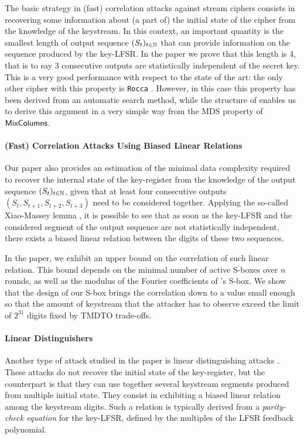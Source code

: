 The basic strategy in (fast) correlation attacks against stream ciphers consists in recovering some information about (a part of) the initial state of the cipher from the knowledge of the keystream. 
In this context, an important quantity is the smallest length of output sequence $(S_t)_{t\in \mathbb{N}}$ that can provide information on the sequence produced by the key-LFSR. In the paper we prove that this length is 4, that is to say 3 consecutive outputs are statistically independent of the secret key. This is a very good performance with respect to the state of the art: the only other cipher with this property is \texttt{Rocca} \cite[Section 4.5]{ToSC:SLNKI21}. However, in this case this property has been derived from an automatic search method, while the structure of \coolName enables us to derive this argument in a very simple way from the MDS property of~$\text{\textsf{MixColumns}}$. 


\paragraph{(Fast) Correlation Attacks Using Biased Linear Relations}


Our paper also provides an estimation of the minimal data complexity required to recover the internal state of the key-register from the knowledge of the output sequence $(S_t)_{t\in \mathbb{N}}$, given that at least four consecutive outputs $(S_t, S_{t+1}, S_{t+2}, S_{t+3})$ need to be considered together. Applying the so-called Xiao-Massey lemma \cite{add:XiaMas88,add:Bry89}, it is possible to see that as soon as the key-LFSR and the considered segment of the output sequence are not statistically independent, there exists a biased linear relation between the digits of these two sequences.

In the paper, we exhibit an upper bound on the correlation of such linear relation. This bound depends on the minimal number of active S-boxes over $n$ rounds, as well as the modulus of the Fourier coefficients of \coolName's S-box. We show that the design of our S-box brings the correlation down to a value small enough so that the amount of keystream that the attacker has to observe exceed the limit of $2^{31}$ digits fixed by TMDTO trade-offs.


\paragraph{Linear Distinguishers}

Another type of attack studied in the paper is linear distinguishing attacks \cite{EC:MeiSta88,EC:CanTra00,FSE:CheJohSme00,C:TIMAZ18}. These attacks do not recover the initial state of the key-register, but the counterpart is that they can use together several keystream segments produced from multiple initial state. They consist in exhibiting a biased linear relation among the keystream digits. Such a relation is typically derived from a \textit{parity-check equation} for the key-LFSR, defined by the multiples of the LFSR feedback polynomial. 

